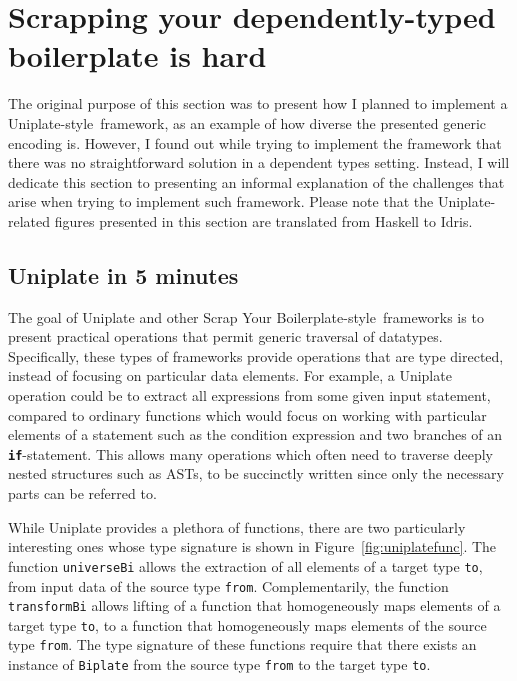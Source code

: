 \documentclass{ituthesis}
\newcommand{\tttype}[1]{\textcolor{type-color}{\texttt{#1}}}
\newcommand{\ttdec}[1]{\textcolor{declared-var-color}{\texttt{#1}}}
\newcommand{\ttvar}[1]{\textcolor{local-var-color}{\texttt{#1}}}
\theoremstyle{break}
\begin{document}
\section{Scrapping your dependently-typed boilerplate is hard}
\label{sec:Scrappingyourdependently-typedboilerplateishard}
The original purpose of this section was to present how I planned to implement a Uniplate-style\,\autocite{mitchell2007uniform} framework, as an example of how diverse the presented generic encoding is.
However, I found out while trying to implement the framework that there was no straightforward solution in a dependent types setting.
Instead, I will dedicate this section to presenting an informal explanation of the challenges that arise when trying to implement such framework.
Please note that the Uniplate-related figures presented in this section are translated from Haskell to Idris.

\subsection{Uniplate in 5 minutes}
\label{sub:Uniplate in 5 minutes}

The goal of Uniplate and other Scrap Your Boilerplate-style\,\autocite{lammel2003scrap} frameworks is to present practical operations that permit generic traversal of datatypes.
Specifically, these types of frameworks provide operations that are type directed, instead of focusing on particular data elements.
For example, a Uniplate operation could be to extract all expressions from some given input statement, compared to ordinary functions which would focus on working with particular elements of a statement such as the condition expression and two branches of an \texttt{\textbf{if}}-statement.
This allows many operations which often need to traverse deeply nested structures such as ASTs, to be succinctly written since only the necessary parts can be referred to.

While Uniplate provides a plethora of functions, there are two particularly interesting ones whose type signature is shown in Figure~\ref{fig:uniplatefunc}.
The function \ttdec{universeBi} allows the extraction of all elements of a target type \ttvar{to}, from input data of the source type \ttvar{from}.
Complementarily, the function \ttdec{transformBi} allows lifting of a function that homogeneously maps elements of a target type \ttvar{to}, to a function that homogeneously maps elements of the source type \ttvar{from}.
The type signature of these functions require that there exists an instance of \tttype{Biplate} from the source type \tttype{from} to the target type \tttype{to}.
\end{document}
